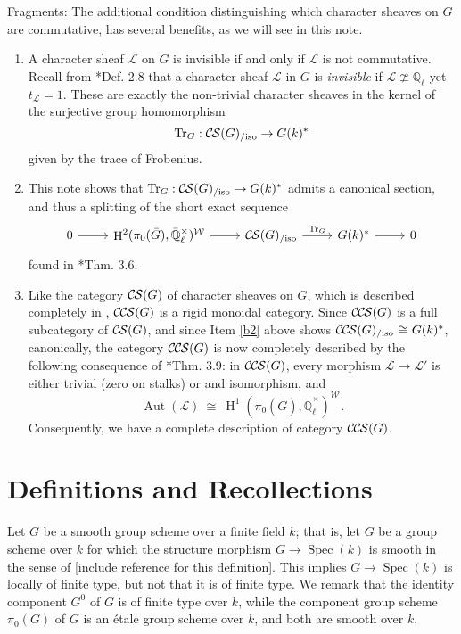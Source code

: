 \documentclass[10pt]{amsart}
\makeatletter
\theoremstyle{plain}
\theoremstyle{definition}
\newcommand{\EE}{\mathbb{\bar Q}_\ell}
\newcommand{\Fq}{k}
\newcommand{\EEx}{\EE^\times}
\newcommand{\Weil}[1]{\mathcal{W}_{#1}}
\DeclareMathOperator{\Aut}{Aut}
\DeclareMathOperator{\Hh}{H}
\newcommand{\Spec}[1]{{\operatorname{Spec}(#1)}}
\newcommand{\iso}{{\ \cong\ }}
\newcommand{\trFrob}[1]{t_{#1}}
\newcommand{\TrFrob}[1]{\operatorname{Tr}_{#1}}
\newcommand{\cs}[1]{{\mathcal{#1}}}
\newcommand{\CS}{{\mathcal{C\hskip-0.8pt S}}}
\newcommand{\CCS}{{\mathcal{C\hskip-.8pt C\hskip-0.8pt S}}}
\newcommand{\CSiso}[1]{\CS(#1)_{/\text{iso}}}
\newcommand{\CCSiso}[1]{\CCS(#1)_{/\text{iso}}}
\newcommand{\labitem}[2]{
\def\@itemlabel{\textbf{#1}}
\item
\def\@currentlabel{#1}\label{#2}}
\newcommand{\bG}{\bar{G}}
\makeatother
\begin{document}
Fragments: 
The additional condition distinguishing which character sheaves on $G$ are commutative, has several benefits, as we will see in this note.
\begin{enumerate}
\labitem{(1)}{b1}
A character sheaf $\cs{L}$ on $G$ is invisible if and only if $\cs{L}$ is not commutative.
Recall from \cite{cunningham-roe:13a}*{Def. 2.8} that a character sheaf $\cs{L}$ in $G$ is {\it invisible} if $\cs{L}  \ncong \EE$ yet $\trFrob{\cs{L}} =1$.
These are exactly the non-trivial character sheaves in the kernel of the surjective group homomorphism 
\[
\TrFrob{G} : \CSiso{G} \to G(\Fq)^*
\]
 given by the trace of Frobenius.
\labitem{(2)}{b2}
This note shows that $\TrFrob{G} : \CSiso{G} \to G(\Fq)^*$ admits a canonical section, and thus a splitting of the short exact sequence 
\[
\begin{tikzcd}
0 \arrow{r} & \Hh^2(\pi_0(\bG),\EEx)^{\Weil{}} \arrow{r} & \CSiso{G} \arrow{r}{\TrFrob{G}} & G(\Fq)^* \arrow{r} & 0
\end{tikzcd}
\]
found in \cite{cunningham-roe:13a}*{Thm. 3.6}.
\labitem{(3)}{b3}
Like the category $\CS(G)$ of character sheaves on $G$, which is described completely in \cite{cunningham-roe:13a}, $\CCS(G)$ is a rigid monoidal category.
Since $\CCS(G)$ is a full subcategory of $\CS(G)$, and since Item \ref{b2} above shows $\CCSiso{G} \iso G(\Fq)^*$, canonically, the category $\CCS(G)$ is now completely described by the following consequence of \cite{cunningham-roe:13a}*{Thm. 3.9}: in $\CCS(G)$, every morphism $\cs{L} \to \cs{L}'$ is either trivial (zero on stalks) or and isomorphism, and
\[
\Aut(\cs{L}) \iso  \Hh^1(\pi_0(\bG), \EEx)^{\Weil{}}.
\]
Consequently, we have a complete description of category $\CCS(G)$.
\end{enumerate}




\section{Definitions and Recollections}

Let $G$ be a smooth group scheme over a finite field $\Fq$; that is, let $G$ be a group scheme over $\Fq$
for which the structure morphism $G \to \Spec{\Fq}$ is smooth in the sense of [include reference for this definition].
This implies $G \to \Spec{\Fq}$ is locally of finite type, but not that it is of finite type.
We remark that the identity component $G^0$ of $G$ is of finite type over $\Fq$, while the component group scheme
$\pi_0(G)$ of $G$ is an \'etale group scheme over $\Fq$, and both are smooth over $\Fq$.
\end{document}
